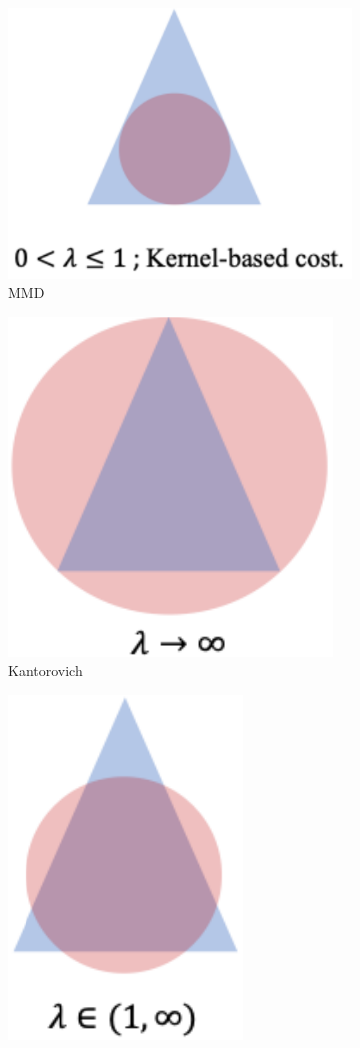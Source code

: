\begin{figure}[t]
\centering
\begin{subfigure}{.3\textwidth}
    \centering
    \includegraphics[scale=0.5]{chapter-1/images/metric1.pdf}  
    \caption{MMD}
\end{subfigure}
\begin{subfigure}{.3\textwidth}
    \centering
    \includegraphics[scale=0.5]{chapter-1/images/metric2.pdf}  
    \caption{Kantorovich}
\end{subfigure}
\begin{subfigure}{.3\textwidth}
    \centering
    \includegraphics[scale=0.5]{chapter-1/images/metric3.pdf}  

\end{subfigure}
\end{figure}
